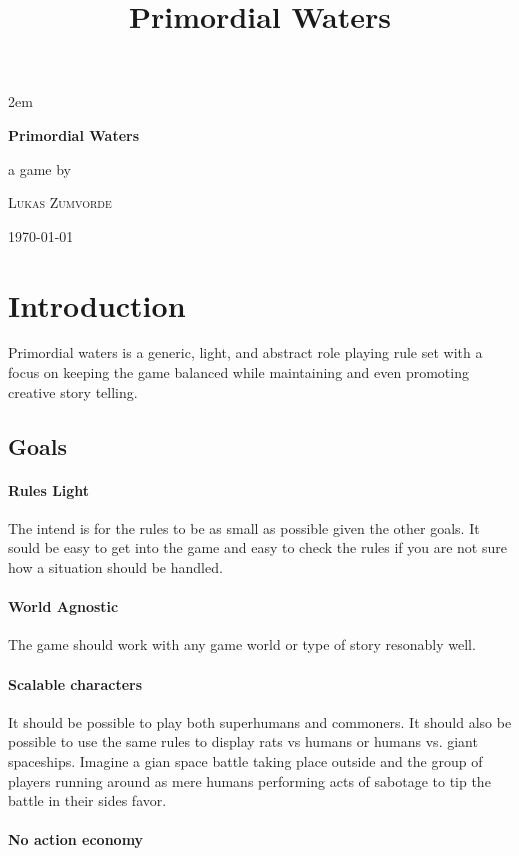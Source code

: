 \documentclass[11pt]{article}
\date{}
\title{Primordial Waters}
\renewcommand\maketitle{
\begin{titlepage}
\centering
\topskip300pt\vspace{5cm}
\fboxsep2em\colorbox{black!100}{
{\color{white}\bfseries\fontsize{24pt}{29pt}\selectfont \quad Primordial Waters\quad\par}
}
\vfill
a game by\par
\textsc{Lukas Zumvorde}

\vfill

{\large \today\par}
\end{titlepage}}
\begin{document}
\maketitle
\tableofcontents

{


\section{Introduction}
\label{sec:org01c9883}

Primordial waters is a generic, light, and abstract role playing rule set with a focus on keeping the game balanced while maintaining and even promoting creative story telling.

\subsection{Goals}
\label{sec:org6c02b89}

\paragraph*{Rules Light}
\label{sec:orgb4802c9}

The intend is for the rules to be as small as possible given the other goals. It sould be easy to get into the game and easy to check the rules if you are not sure how a situation should be handled.

\paragraph*{World Agnostic}
\label{sec:orge38e12b}

The game should work with any game world or type of story resonably well.

\paragraph*{Scalable characters}
\label{sec:org522e34b}

It should be possible to play both superhumans and commoners. It should also be possible to use the same rules to display rats vs humans or humans vs. giant spaceships. Imagine a gian space battle taking place outside and the group of players running around as mere humans performing acts of sabotage to tip the battle in their sides favor. 

\paragraph*{No action economy}
\label{sec:orgb179f6b}

}
\end{document}
